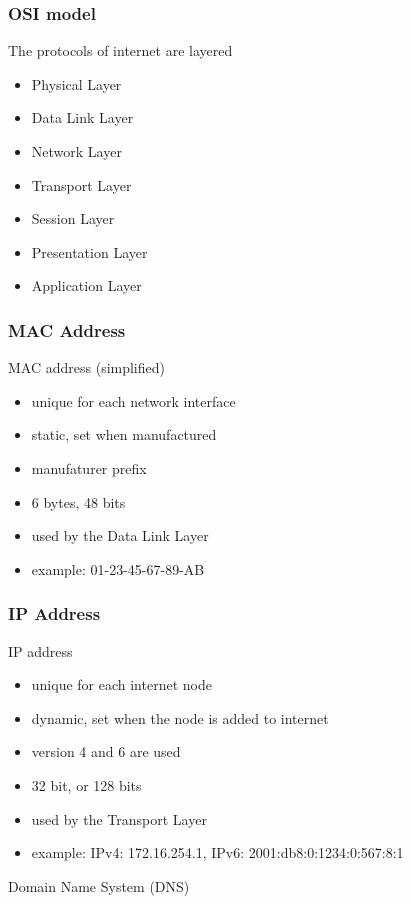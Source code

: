 \begin{frame}[fragile] \frametitle{OSI model}
The protocols of internet are layered
\begin{itemize}
  \item Physical Layer
  \item Data Link Layer
  \item Network Layer
  \item Transport Layer
  \item Session Layer
  \item Presentation Layer
  \item Application Layer
\end{itemize}
\end{frame}

\begin{frame}[fragile]\frametitle{MAC Address}
MAC address (simplified)
\begin{itemize}
  \item unique for each network interface
  \item static, set when manufactured
  \item manufaturer prefix
  \item 6 bytes, 48 bits
  \item used by the Data Link Layer
  \item example: 01-23-45-67-89-AB
\end{itemize}
\end{frame}

\begin{frame}[fragile]\frametitle{IP Address}
IP address
\begin{itemize}
  \item unique for each internet node
  \item dynamic, set when the node is added to internet
  \item version 4 and 6 are used
  \item 32 bit, or 128 bits
  \item used by the Transport Layer
  \item example: IPv4: 172.16.254.1, IPv6: 2001:db8:0:1234:0:567:8:1
\end{itemize}
Domain Name System (DNS)
\end{frame}

